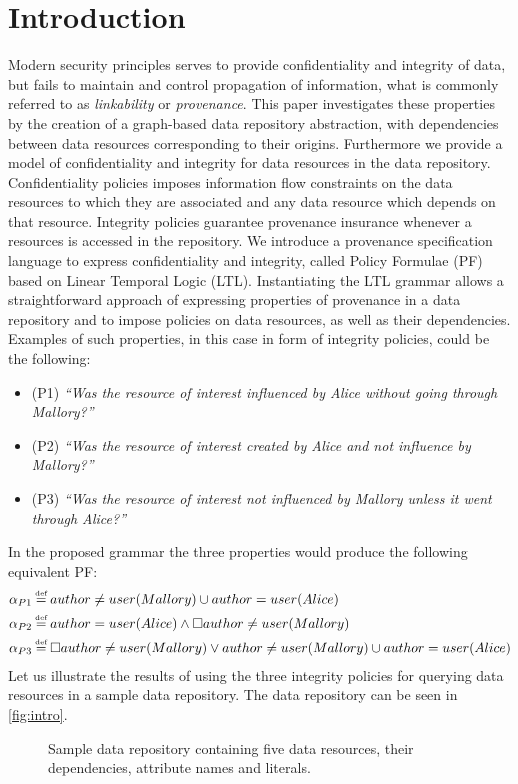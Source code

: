 \section{Introduction}
Modern security principles serves to provide confidentiality and integrity of data, but fails to maintain and control propagation of information, what is commonly referred to as \emph{linkability} or \emph{provenance}. This paper investigates these properties by the creation of a graph-based data repository abstraction, with dependencies between data resources corresponding to their origins. Furthermore we provide a model of confidentiality and integrity for data resources in the data repository. Confidentiality policies imposes information flow constraints on the data resources to which they are associated and any data resource which depends on that resource. Integrity policies guarantee provenance insurance whenever a resources is accessed in the repository. We introduce a provenance specification language to express confidentiality and integrity, called Policy Formulae (PF) based on Linear Temporal Logic (LTL). Instantiating the LTL grammar allows a straightforward approach of expressing properties of provenance in a data repository and to impose policies on data resources, as well as their dependencies. Examples of such properties, in this case in form of integrity policies, could be the following:
\begin{itemize}
    \item (P1) \emph{``Was the resource of interest influenced by Alice without going through Mallory?''}
    \item (P2) \emph{``Was the resource of interest created by Alice and not influence by Mallory?''}
    \item (P3) \emph{``Was the resource of interest not influenced by Mallory unless it went through Alice?''}
\end{itemize}
In the proposed grammar the three properties would produce the following equivalent PF:
\begin{align*}
    \pf_{P1} &\eqdef author \neq user(Mallory) \U author = user(Alice) \\
    \pf_{P2} &\eqdef author = user(Alice) \land \G author \neq user(Mallory) \\
    \pf_{P3} &\eqdef \G author \neq user(Mallory) \lor author \neq user(Mallory) \U author = user(Alice)
\end{align*}
Let us illustrate the results of using the three integrity policies for querying data resources in a sample data repository. The data repository can be seen in \autoref{fig:intro}.
\begin{figure}[!ht]
    \begin{center}
        
        \caption{Sample data repository containing five data resources, their dependencies, attribute names and literals.}
        \label{fig:intro}
    \end{center}
\end{figure}

